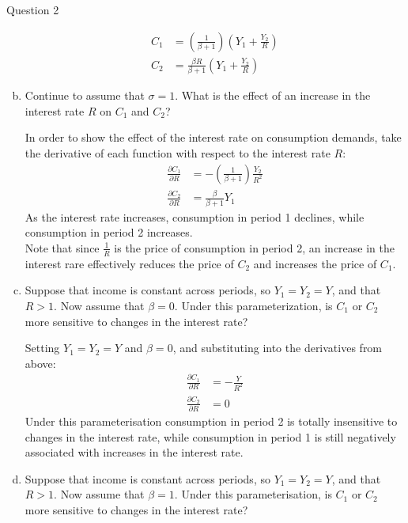 \documentclass[a4paper]{article}
\newif\IfInSansMode
\begin{document}
\begin{questionbox}{Question 2}
\begin{enumerate}[(a)]
\begin{explanationbox}
\begin{align*}
					C_1 &= \left( \frac{1}{\beta + 1} \right) \left( Y_1 + \frac{Y_2}{R} \right)\\
					C_2 &= \frac{\beta R}{\beta + 1} \left( Y_1 + \frac{Y_2}{R} \right)
				\end{align*}
			\end{explanationbox}\pagebreak
			\item Continue to assume that \( \sigma = 1 \). What is the effect of an increase in the interest rate \( R \) on \( C_1 \) and \( C_2 \)?
			\begin{explanationbox}
				In order to show the effect of the interest rate on consumption demands, take the derivative of each function with respect to the interest rate \( R \):
				\begin{align*}
					\frac{\partial C_1}{\partial R} &= -\left( \frac{1}{\beta + 1} \right) \frac{Y_2}{R^2}\\
					\frac{\partial C_2}{\partial R} &= \frac{\beta}{\beta + 1} Y_1
				\end{align*}
				As the interest rate increases, consumption in period 1 declines, while consumption in period 2 increases.\\
				Note that since \( \frac{1}{R} \) is the price of consumption in period 2, an increase in the interest rare effectively reduces the price of \( C_2 \) and increases the price of \( C_1 \).
			\end{explanationbox}
			\item Suppose that income is constant across periods, so \( Y_1 = Y_2 = Y \), and that \( R > 1 \). Now assume that \( \beta = 0 \). Under this parameterization, is \( C_1 \) or \( C_2 \) more sensitive to changes in the interest rate?
			\begin{explanationbox}
				Setting \( Y_1 = Y_2 = Y \) and \( \beta = 0 \), and substituting into the derivatives from above:
				\begin{align*}
					\frac{\partial C_1}{\partial R} &= -\frac{Y}{R^2}\\
					\frac{\partial C_2}{\partial R} &= 0
				\end{align*}
				Under this parameterisation consumption in period 2 is totally insensitive to changes in the interest rate, while consumption in period 1 is still negatively associated with increases in the interest rate.
			\end{explanationbox}
			\item Suppose that income is constant across periods, so \( Y_1 = Y_2 = Y \), and that \( R > 1 \). Now assume that \( \beta = 1 \). Under this parameterisation, is \( C_1 \) or \( C_2 \) more sensitive to changes in the interest rate?

\end{enumerate}
\end{questionbox}
\end{document}
